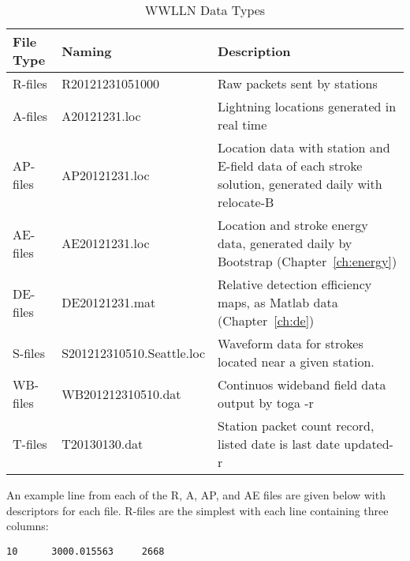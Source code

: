 \begin{table}[h!]
\begin{center}
\caption{WWLLN Data Types}
\begin{tabular}{|p{.75in}|p{2in}|p{3.5in}|}

\hline
{\bf File Type} & {\bf Naming} &	{\bf Description} \\

\hline
\rule{0pt}{3ex}
R-files	& R20121231051000	&	Raw packets sent by stations\\ 

\hline
\rule{0pt}{3ex}
A-files	& A20121231.loc	&	Lightning locations generated in real time\\ 

\hline
\rule{0pt}{3ex}
AP-files	& AP20121231.loc	&	Location data with station and E-field data of each stroke solution, generated daily with relocate-B\\ 

\hline
\rule{0pt}{3ex}
AE-files	& AE20121231.loc	&	Location and stroke energy data, generated daily by Bootstrap (Chapter~\ref{ch:energy})\\ 

\hline
\rule{0pt}{3ex}
DE-files	& DE20121231.mat	&	Relative detection efficiency maps, as Matlab data (Chapter~\ref{ch:de})\\ 

\hline
\rule{0pt}{3ex}
S-files	& S201212310510.Seattle.loc	&	Waveform data for strokes located near a given station.\\ 

\hline
\rule{0pt}{3ex}
WB-files	& WB201212310510.dat	&	Continuos wideband field data output by toga -r\\ 

\hline
\rule{0pt}{3ex}
T-files	& T20130130.dat	&	Station packet count record, listed date is last date updated-r\\ 

\hline
\end{tabular}
\end{center}
\label{code:fileType}
\end{table}
 
An example line from each of the R, A, AP, and AE files are given below with descriptors for each file.
R-files are the simplest with each line containing three columns:

\begin{verbatim}
10      3000.015563     2668
\end{verbatim}


